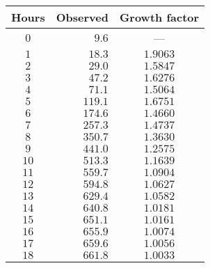 \begin{tabular}{crc}               \toprule
Hours & Observed & Growth factor \\\midrule
$0$   & $9.6$    & ---           \\[4pt]
$1$   & $18.3$   & $1.9063$      \\[4pt]
$2$   & $29.0$   & $1.5847$      \\[4pt]
$3$   & $47.2$   & $1.6276$      \\[4pt]
$4$   & $71.1$   & $1.5064$      \\[4pt]
$5$   & $119.1$  & $1.6751$      \\[4pt]
$6$   & $174.6$  & $1.4660$      \\[4pt]
$7$   & $257.3$  & $1.4737$      \\[4pt]
$8$   & $350.7$  & $1.3630$      \\[4pt]
$9$   & $441.0$  & $1.2575$      \\[4pt]
$10$  & $513.3$  & $1.1639$      \\[4pt]
$11$  & $559.7$  & $1.0904$      \\[4pt]
$12$  & $594.8$  & $1.0627$      \\[4pt]
$13$  & $629.4$  & $1.0582$      \\[4pt]
$14$  & $640.8$  & $1.0181$      \\[4pt]
$15$  & $651.1$  & $1.0161$      \\[4pt]
$16$  & $655.9$  & $1.0074$      \\[4pt]
$17$  & $659.6$  & $1.0056$      \\[4pt]
$18$  & $661.8$  & $1.0033$      \\\bottomrule
\end{tabular}
